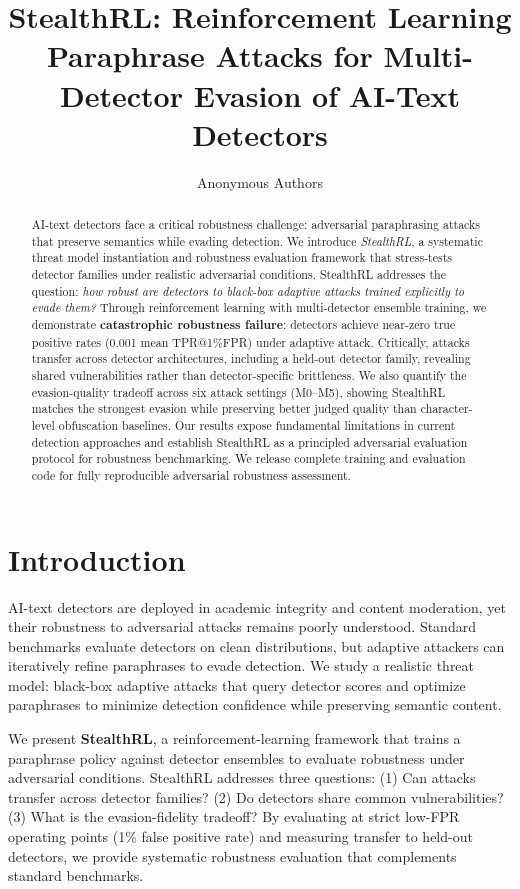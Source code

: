 \documentclass{article} %
\title{StealthRL: Reinforcement Learning Paraphrase Attacks for Multi-Detector Evasion of AI-Text Detectors}
\author{Anonymous Authors}
\begin{document}
\maketitle

\begin{abstract}
AI-text detectors face a critical robustness challenge: adversarial paraphrasing attacks that preserve semantics while evading detection. We introduce \emph{StealthRL}, a systematic threat model instantiation and robustness evaluation framework that stress-tests detector families under realistic adversarial conditions. StealthRL addresses the question: \textit{how robust are detectors to black-box adaptive attacks trained explicitly to evade them?} Through reinforcement learning with multi-detector ensemble training, we demonstrate \textbf{catastrophic robustness failure}: detectors achieve near-zero true positive rates (0.001 mean TPR@1\%FPR) under adaptive attack. Critically, attacks transfer across detector architectures, including a held-out detector family, revealing shared vulnerabilities rather than detector-specific brittleness. We also quantify the evasion-quality tradeoff across six attack settings (M0--M5), showing StealthRL matches the strongest evasion while preserving better judged quality than character-level obfuscation baselines. Our results expose fundamental limitations in current detection approaches and establish StealthRL as a principled adversarial evaluation protocol for robustness benchmarking. We release complete training and evaluation code for fully reproducible adversarial robustness assessment.
\end{abstract}

\section{Introduction}
AI-text detectors are deployed in academic integrity and content moderation, yet their robustness to adversarial attacks remains poorly understood. Standard benchmarks evaluate detectors on clean distributions, but adaptive attackers can iteratively refine paraphrases to evade detection. We study a realistic threat model: black-box adaptive attacks that query detector scores and optimize paraphrases to minimize detection confidence while preserving semantic content.

We present \textbf{StealthRL}, a reinforcement-learning framework that trains a paraphrase policy against detector ensembles to evaluate robustness under adversarial conditions. StealthRL addresses three questions: (1) Can attacks transfer across detector families? (2) Do detectors share common vulnerabilities? (3) What is the evasion-fidelity tradeoff? By evaluating at strict low-FPR operating points (1\% false positive rate) and measuring transfer to held-out detectors, we provide systematic robustness evaluation that complements standard benchmarks.
\end{document}
